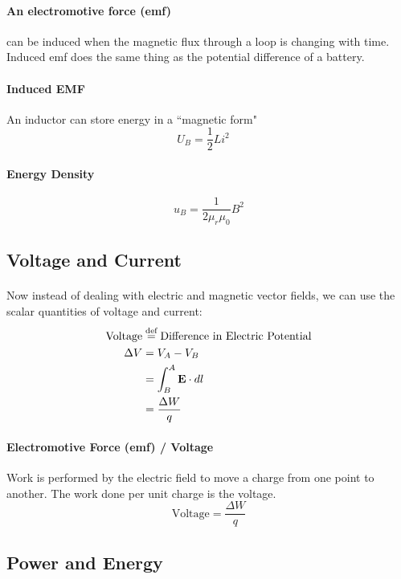 \documentclass[11pt]{article}
\begin{document}
\paragraph{An electromotive force (emf)} can be induced when the magnetic flux
through a loop is changing with time. Induced emf does the same thing as the potential difference of a
battery. 
\paragraph{Induced EMF} An inductor can store energy in a ``magnetic form"
\begin{equation}
    U_B = \frac{1}{2} L i^2 \quad 
\end{equation}
\paragraph{Energy Density}
\begin{equation}
    u_B = \frac{1}{2 \mu_r \mu_0} B^2
\end{equation}
\subsection{Voltage and Current}
\paragraph{} Now instead of dealing with electric and magnetic vector fields, we can
use the scalar quantities of voltage and current:
\begin{align}
    \text{Voltage} &\stackrel{\text{def}}{=} \text{Difference in Electric Potential}\nonumber \\ 
    \Delta V &= V_A - V_B \nonumber \\
    &= \int_B^A \textbf{E} \cdot dl \nonumber\\
    &= \frac{\Delta W}{q}
\end{align}

\paragraph{Electromotive Force (emf) / Voltage} Work is performed by 
the electric field to move a charge from one point to another. 
The work done per unit charge is the voltage.
\begin{equation}
    \text{Voltage} = \frac{\Delta W}{q}
\end{equation}
\subsection{Power and Energy}
\end{document}

